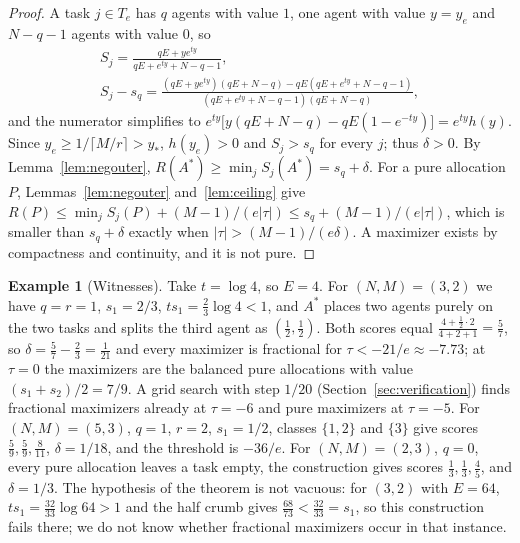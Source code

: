 \documentclass[11pt]{article}
\theoremstyle{plain}
\theoremstyle{definition}
\newtheorem{example}[theorem]{Example}
\theoremstyle{remark}
\begin{document}
\begin{proof}
A task $j\in T_e$ has $q$ agents with value $1$, one agent with value $y=y_e$ and $N-q-1$ agents with value $0$, so
\begin{gather*}
 S_j=\frac{qE+ye^{ty}}{qE+e^{ty}+N-q-1},\\
 S_j-s_q=\frac{(qE+ye^{ty})(qE+N-q)-qE(qE+e^{ty}+N-q-1)}{(qE+e^{ty}+N-q-1)(qE+N-q)},
\end{gather*}
and the numerator simplifies to $e^{ty}\bigl[y(qE+N-q)-qE(1-e^{-ty})\bigr]=e^{ty}h(y)$. Since $y_e\ge1/\lceil M/r\rceil>y_*$, $h(y_e)>0$ and $S_j>s_q$ for every $j$; thus $\delta>0$. By Lemma~\ref{lem:negouter}, $R(A^*)\ge\min_jS_j(A^*)=s_q+\delta$. For a pure allocation $P$, Lemmas~\ref{lem:negouter} and~\ref{lem:ceiling} give $R(P)\le\min_jS_j(P)+(M-1)/(e|\tau|)\le s_q+(M-1)/(e|\tau|)$, which is smaller than $s_q+\delta$ exactly when $|\tau|>(M-1)/(e\delta)$. A maximizer exists by compactness and continuity, and it is not pure.
\end{proof}

\begin{example}[Witnesses]\label{ex:witnesses}
Take $t=\log4$, so $E=4$. For $(N,M)=(3,2)$ we have $q=r=1$, $s_1=2/3$, $ts_1=\frac23\log4<1$, and $A^*$ places two agents purely on the two tasks and splits the third agent as $(\frac12,\frac12)$. Both scores equal $\frac{4+\frac12\cdot2}{4+2+1}=\frac57$, so $\delta=\frac57-\frac23=\frac1{21}$ and every maximizer is fractional for $\tau<-21/e\approx-7.73$; at $\tau=0$ the maximizers are the balanced pure allocations with value $(s_1+s_2)/2=7/9$. A grid search with step $1/20$ (Section~\ref{sec:verification}) finds fractional maximizers already at $\tau=-6$ and pure maximizers at $\tau=-5$. For $(N,M)=(5,3)$, $q=1$, $r=2$, $s_1=1/2$, classes $\{1,2\}$ and $\{3\}$ give scores $\frac59,\frac59,\frac8{11}$, $\delta=1/18$, and the threshold is $-36/e$. For $(N,M)=(2,3)$, $q=0$, every pure allocation leaves a task empty, the construction gives scores $\frac13,\frac13,\frac45$, and $\delta=1/3$. The hypothesis of the theorem is not vacuous: for $(3,2)$ with $E=64$, $ts_1=\frac{32}{33}\log64>1$ and the half crumb gives $\frac{68}{73}<\frac{32}{33}=s_1$, so this construction fails there; we do not know whether fractional maximizers occur in that instance.
\end{example}
\end{document}
